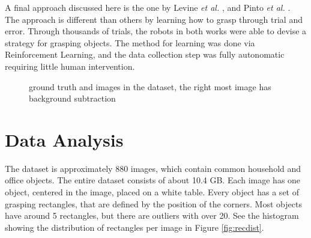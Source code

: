 \documentclass{article}
\begin{document}
A final approach discussed here is the one by Levine \textit{et al.} \cite{levine2018},
and Pinto \textit{et al.} \cite{pinto2016}. The approach is different than others by
learning how to grasp through trial and error. Through thousands of trials, the
robots in both works were able to devise a strategy for grasping objects. The method
for learning was done via Reinforcement Learning, and the data collection step was
fully autonomatic requiring little human intervention.

\newpage

\begin{figure}
\centering
{}
\caption{ground truth and images in the dataset, the right most image has background subtraction}
\end{figure}

\section{Data Analysis}
The dataset is approximately 880 images, which contain common
household and office objects. The entire dataset consists of about 10.4 GB.
Each image has one object, centered in the image, placed on a white table.
Every object has a set of grasping rectangles, that are defined by the position
of the corners. Most objects have around 5 rectangles, but there are outliers
with over 20. See the histogram showing the distribution of rectangles per image
in Figure \ref{fig:recdist}.
\end{document}
